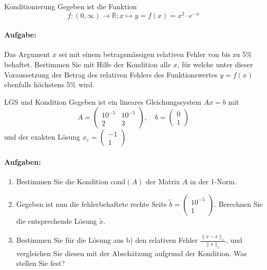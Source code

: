 \begin{example2}{Konditionierung}
Gegeben ist die Funktion
$$f: (0,\infty) \rightarrow \mathbb{R}; x \mapsto y = f(x) = x^2 \cdot e^{-x}$$

\paragraph{Aufgabe:}
Das Argument $x$ sei mit einem betragsmässigen relativen Fehler von bis zu 5\% behaftet. Bestimmen Sie mit Hilfe der Kondition alle $x$, für welche unter dieser Voraussetzung der Betrag des relativen Fehlers des Funktionswertes $y = f(x)$ ebenfalls höchstens 5\% wird.
\end{example2}

\begin{example2}{LGS und Kondition}
Gegeben ist ein lineares Gleichungssystem $Ax = b$ mit
$$A = \begin{pmatrix}
10^{-5} & 10^{-5}\\
2 & 3
\end{pmatrix}, \quad
b = \begin{pmatrix}
0\\
1
\end{pmatrix}$$
und der exakten Lösung $x_e = \begin{pmatrix}-1\\1\end{pmatrix}$

\paragraph{Aufgaben:}
\begin{enumerate}
    \item Bestimmen Sie die Kondition cond$(A)$ der Matrix $A$ in der 1-Norm.
    
    \item Gegeben ist nun die fehlerbehaftete rechte Seite $\tilde{b} = \begin{pmatrix}10^{-5}\\1\end{pmatrix}$. Berechnen Sie die entsprechende Lösung $\tilde{x}$.
    
    \item Bestimmen Sie für die Lösung aus b) den relativen Fehler $\frac{\|\tilde{x}-x\|_1}{\|x\|_1}$, und vergleichen Sie diesen mit der Abschätzung aufgrund der Kondition. Was stellen Sie fest?
\end{enumerate}
\end{example2}

